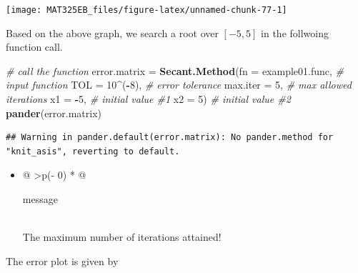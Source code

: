 \documentclass[
]{book}
\newenvironment{Shaded}{\begin{snugshade}}{\end{snugshade}}
\newcommand{\AttributeTok}[1]{\textcolor[rgb]{0.13,0.29,0.53}{#1}}
\newcommand{\CommentTok}[1]{\textcolor[rgb]{0.56,0.35,0.01}{\textit{#1}}}
\newcommand{\DecValTok}[1]{\textcolor[rgb]{0.00,0.00,0.81}{#1}}
\newcommand{\FunctionTok}[1]{\textcolor[rgb]{0.13,0.29,0.53}{\textbf{#1}}}
\newcommand{\NormalTok}[1]{#1}
\newcommand{\OtherTok}[1]{\textcolor[rgb]{0.56,0.35,0.01}{#1}}
\newcommand{\SpecialCharTok}[1]{\textcolor[rgb]{0.81,0.36,0.00}{\textbf{#1}}}
\begin{document}
\begin{center}\texttt{[image: MAT325EB\_files/figure-latex/unnamed-chunk-77-1]} \end{center}

Based on the above graph, we search a root over \([-5, 5]\) in the follwoing function call.

\begin{Shaded}
\begin{Highlighting}[]
\CommentTok{\# call the function}
\NormalTok{error.matrix }\OtherTok{=} \FunctionTok{Secant.Method}\NormalTok{(}\AttributeTok{fn =}\NormalTok{ example01.func,       }\CommentTok{\# input function}
                      \AttributeTok{TOL =} \DecValTok{10}\SpecialCharTok{\^{}}\NormalTok{(}\SpecialCharTok{{-}}\DecValTok{8}\NormalTok{),               }\CommentTok{\# error tolerance }
                      \AttributeTok{max.iter =} \DecValTok{5}\NormalTok{,               }\CommentTok{\# max allowed iterations}
                      \AttributeTok{x1 =} \SpecialCharTok{{-}}\DecValTok{5}\NormalTok{,                     }\CommentTok{\# initial value \#1}
                      \AttributeTok{x2 =} \DecValTok{5}\NormalTok{)                      }\CommentTok{\# initial value \#2}
\FunctionTok{pander}\NormalTok{(error.matrix)}
\end{Highlighting}
\end{Shaded}

\begin{verbatim}
## Warning in pander.default(error.matrix): No pander.method for "knit_asis", reverting to default.
\end{verbatim}

\begin{itemize}
\item
  \begin{longtable}[]{@{}
    >{\centering\arraybackslash}p{(\columnwidth - 0\tabcolsep) * }@{}}
  \toprule\noalign{}
  \begin{minipage}[b]{\linewidth}\centering
  message
  \end{minipage} \\
  \midrule\noalign{}
  \endhead
  \bottomrule\noalign{}
  \endlastfoot
  The maximum number of
  iterations attained! \\
  \end{longtable}
\end{itemize}

The error plot is given by
\end{document}
